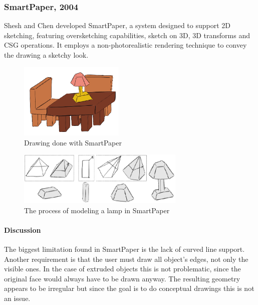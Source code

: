 \subsubsection{SmartPaper, 2004}

Shesh and Chen \cite{SMARTPAPER} developed SmartPaper, a system designed to support
2D sketching, featuring oversketching capabilities, sketch on 3D, 3D transforms and
CSG operations. It employs a non-photorealistic rendering technique to convey the
drawing a sketchy look.

\begin{figure}[!ht]
	\centering
	\includegraphics[width=5cm]{gfx/smartpaper.png}
	\caption{Drawing done with SmartPaper}
	\label{FIG-SMARTPAPER}
\end{figure}

\begin{figure}[!ht]
	\centering
	\includegraphics[width=8cm]{gfx/smartpaper2.png}
	\caption{The process of modeling a lamp in SmartPaper}
	\label{FIG-SMARTPAPER2}
\end{figure}

\paragraph{Discussion}
\label{sec:Paragraph}

The biggest limitation found in SmartPaper is the lack of curved line support.
Another requirement is that the user must draw all object's edges, not only
the visible ones. In the case of extruded objects this is not problematic, since
the original face would always have to be drawn anyway.
The resulting geometry appears to be irregular but since the goal is to do
conceptual drawings this is not an issue.

